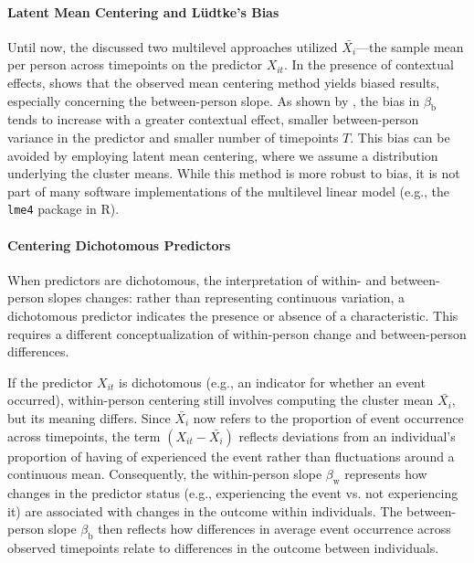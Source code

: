 \documentclass[stu]{apa7}
\begin{document}
\paragraph{Latent Mean Centering and Lüdtke's Bias}

Until now, the discussed two multilevel approaches utilized $\bar{X_i}$---the sample mean per person across timepoints on the predictor $X_{it}$. In the presence of contextual effects, \textcite{ludtke_multilevel_2008}  shows that the observed mean centering method yields biased results, especially concerning the between-person slope. As shown by \parencite[]{asparouhov_latent_2019}, the bias in $\beta_\text{b}$ tends to increase with a greater contextual effect, smaller between-person variance in the predictor and smaller number of timepoints $T$. This bias can be avoided by employing latent mean centering, where we assume a distribution underlying the cluster means. While this method is more robust to bias, it is not part of many software implementations of the multilevel linear model (e.g., the \texttt{lme4} package in R).


\paragraph{Centering Dichotomous Predictors}

When predictors are dichotomous, the interpretation of within- and between-person slopes changes: rather than representing continuous variation, a dichotomous predictor indicates the presence or absence of a characteristic. This requires a different conceptualization of within-person change and between-person differences.

If the predictor \( X_{it} \) is dichotomous (e.g., an indicator for whether an event occurred), within-person centering still involves computing the cluster mean \( \bar{X_i} \), but its meaning differs. Since \( \bar{X_i} \) now refers to the proportion of event occurrence across timepoints, the term \( (X_{it} - \bar{X_i}) \) reflects deviations from an individual's proportion of having of experienced the event rather than fluctuations around a continuous mean. Consequently, the within-person slope \( \beta_\text{w} \) represents how changes in the predictor status (e.g., experiencing the event vs. not experiencing it) are associated with changes in the outcome within individuals. The between-person slope \( \beta_\text{b} \) then reflects how differences in average event occurrence across observed timepoints relate to differences in the outcome between individuals. 
\end{document}
